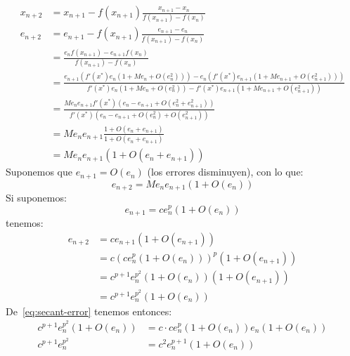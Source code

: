   \begin{align*}
    x_{n+2}
      &= x_{n + 1} - f(x_{n + 1}) \frac{x_{n + 1} - x_n}
                                       {f(x_{n + 1}) - f(x_n)} \\
    e_{n + 2}
      &= e_{n + 1} - f(x_{n + 1})
          \frac{e_{n + 1} - e_n}{f(x_{n + 1}) - f(x_n)} \\
      &= \frac{e_n f(x_{n + 1}) - e_{n + 1} f(x_n)}
              {f(x_{n + 1}) - f(x_n)} \\
      &= \frac{e_{n + 1} \left(
                           f'(x^*) e_n (1 + M e_n + O(e_n^2))
                         \right)
                 - e_n \left(
                          f'(x^*) e_{n + 1} (1 + M e_{n + 1} + O(e_{n + 1}^2))
                        \right)}
              {f'(x^*) e_n (1 + M e_n + O(e_n^2))
                 - f'(x^*) e_{n + 1} (1 + M e_{n + 1} + O(e_{n + 1}^2))} \\
      &= \frac{M e_n e_{n + 1} f'(x^*)
                 (e_n - e_{n + 1} + O(e_n^2 + e_{n + 1}^2))}
              {f'(x^*) (e_n - e_{n + 1} + O(e_n^2) + O(e_{n + 1}^2))} \\
      &= M e_n e_{n + 1}
           \frac{1 + O(e_n + e_{n + 1})}{1 + O(e_n + e_{n + 1})} \\
      &= M e_n e_{n + 1} \left( 1 + O(e_n + e_{n + 1}) \right)
  \end{align*}
  Suponemos que \(e_{n + 1} = O(e_n)\)
  (los errores disminuyen),
  con lo que:
  \begin{equation}
    \label{eq:secant-error}
    e_{n + 2}
      = M e_n e_{n + 1} \left( 1 + O(e_n) \right)
  \end{equation}
  Si suponemos:
  \begin{equation*}
    e_{n + 1}
      = c e_n^p \left( 1 + O(e_n) \right)
  \end{equation*}
  tenemos:
  \begin{align*}
    e_{n + 2}
      &= c e_{n + 1} \left( 1 + O(e_{n + 1}) \right) \\
      &= c \left( c e_n^p \left( 1 + O(e_n) \right) \right)^p
           \left( 1 + O(e_{n + 1}) \right) \\
      &= c^{p + 1} e_n^{p^2}
           \left( 1 + O(e_n) \right)
           \left( 1 + O(e_{n + 1}) \right) \\
      &= c^{p + 1} e_n^{p^2}
           \left( 1 + O(e_n) \right)
  \end{align*}
  De~\eqref{eq:secant-error} tenemos entonces:
  \begin{align*}
    c^{p + 1} e_n^{p^2} \left( 1 + O(e_n) \right)
      &= c \cdot c e_n^p \left( 1 + O(e_n) \right)
           e_n \left( 1 + O(e_n) \right) \\
    c^{p + 1} e_n^{p^2}
      &= c^2 e_n^{p + 1} \left( 1 + O(e_n) \right)
  \end{align*}
